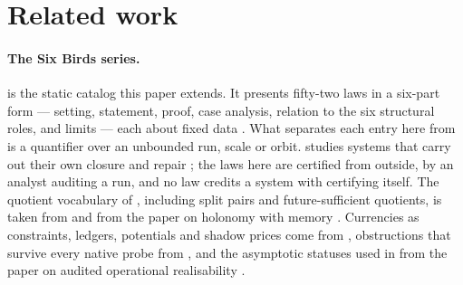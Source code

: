 \section{Related work}\label{sec:related}

\paragraph{The Six Birds series.} \FoundIV{} is the static catalog this paper extends. It presents
fifty-two laws in a six-part form --- setting, statement, proof, case analysis, relation to the six
structural roles, and limits --- each about fixed data \citep{Tsiokos2026FoundIV}. What separates each entry
here from \FoundIV{} is a quantifier over an unbounded run, scale or orbit. \FoundV{} studies
systems that carry out their own closure and repair \citep{FoundationsVCognition}; the laws here are
certified from outside, by an analyst auditing a run, and no law credits a system with certifying
itself. The quotient vocabulary of , including split pairs and future-sufficient
quotients, is taken from \FoundIV{} and from the paper on holonomy with memory
\citep{Tsiokos2026Holonomy,Tsiokos2026Hiddenness}. Currencies as constraints, ledgers, potentials
and shadow prices come from \citet{Tsiokos2026Currency}, obstructions that survive every native
probe from \citet{Tsiokos2026NeedleKiller}, and the asymptotic statuses used in 
from the paper on audited operational realisability \citep{Tsiokos2026AOR}.

